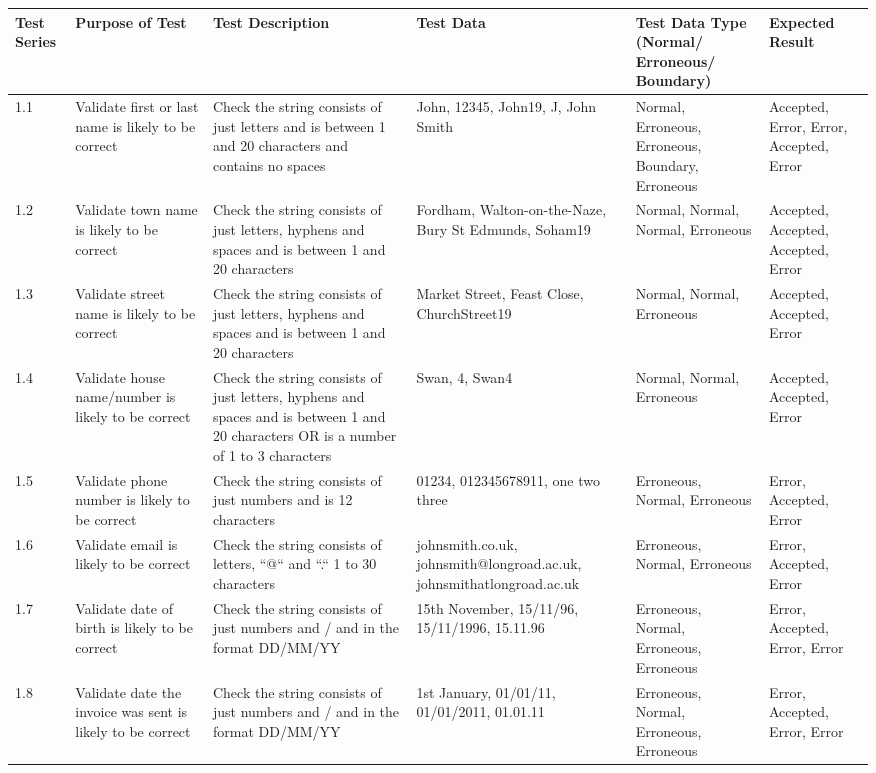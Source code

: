 \begin{landscape}
\begin{center}
    \begin{longtable}{|p{1.5cm}|p{2.5cm}|p{2.5cm}|p{2cm}|p{2cm}|p{2cm}|}
        \hline
        \textbf{Test Series} & \textbf{Purpose of Test} & \textbf{Test Description} & \textbf{Test Data} & \textbf{Test Data Type (Normal/ Erroneous/ Boundary)} & \textbf{Expected Result} \\ \hline
        1.1 & Validate first or last name is likely to be correct & Check the string consists of just letters and is between 1 and 20 characters and contains no spaces & John, 12345, John19, J, John Smith & Normal, Erroneous, Erroneous, Boundary, Erroneous & Accepted, Error, Error, Accepted, Error \\ \hline
        1.2 & Validate town name is likely to be correct & Check the string consists of just letters, hyphens and spaces and is between 1 and 20 characters & Fordham, Walton-on-the-Naze, Bury St Edmunds, Soham19 & Normal, Normal, Normal, Erroneous & Accepted, Accepted, Accepted, Error \\ \hline
        1.3 & Validate street name is likely to be correct & Check the string consists of just letters, hyphens and spaces and is between 1 and 20 characters & Market Street, Feast Close, ChurchStreet19 & Normal, Normal, Erroneous & Accepted, Accepted, Error \\ \hline
        1.4 & Validate house name/number is likely to be correct & Check the string consists of just letters, hyphens and spaces and is between 1 and 20 characters OR is a number of 1 to 3 characters & Swan, 4, Swan4 & Normal, Normal, Erroneous & Accepted, Accepted, Error \\ \hline
        1.5 & Validate phone number is likely to be correct & Check the string consists of just numbers and is 12 characters & 01234, 012345678911, one two three & Erroneous, Normal, Erroneous & Error, Accepted, Error \\ \hline
        1.6 & Validate email is likely to be correct & Check the string consists of letters, ``@`` and ``.`` 1 to  30 characters & johnsmith.co.uk, johnsmith@longroad.ac.uk, johnsmithatlongroad.ac.uk & Erroneous, Normal, Erroneous & Error, Accepted, Error \\ \hline
        1.7 & Validate date of birth is likely to be correct & Check the string consists of just numbers and / and in the format DD/MM/YY & 15th November, 15/11/96, 15/11/1996, 15.11.96 & Erroneous, Normal, Erroneous, Erroneous & Error, Accepted, Error, Error \\ \hline
        1.8 & Validate date the invoice was sent is likely to be correct & Check the string consists of just numbers and / and in the format DD/MM/YY & 1st January, 01/01/11, 01/01/2011, 01.01.11 & Erroneous, Normal, Erroneous, Erroneous & Error, Accepted, Error, Error \\ \hline
        

\end{longtable}
\end{center}
\end{landscape}
